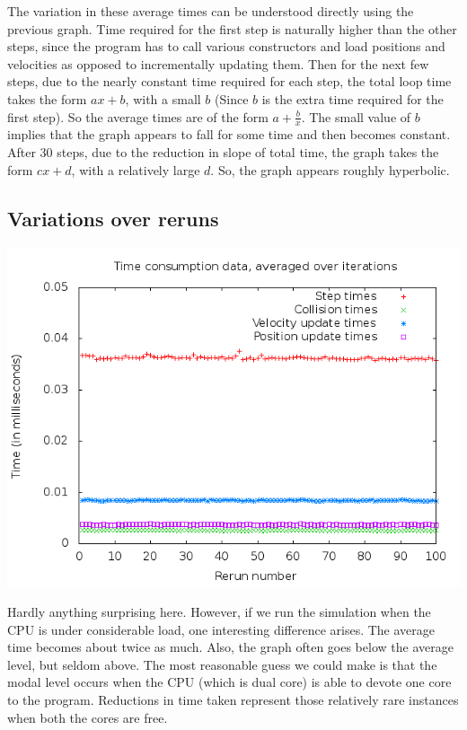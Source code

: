 \documentclass[a4paper,11pt]{article}
\begin{document}
			The variation in these average times can be understood directly using
			the previous graph. Time required for the first step is naturally
			higher than the other steps, since the program has to call various
			constructors and load positions and velocities as opposed to
			incrementally updating them. Then for the next few steps, due to the
			nearly constant time required for each step, the total loop time takes
			the form $ax+b$, with a small $b$ (Since $b$ is the extra time
			required for the first step). So the average times are of the form
			$a+\frac{b}{x}$. The small value of $b$ implies that the graph appears
			to fall for some time and then becomes constant. After 30 steps, due
			to the reduction in slope of total time, the graph takes the form
			$cx+d$, with a relatively large $d$. So, the graph appears roughly
			hyperbolic.
		
		\subsection{Variations over reruns}
			\begin{center}
				\includegraphics[scale=0.5]{./doc/images/g16_plot03.png}
			\end{center}
			
			Hardly anything surprising here. However, if we run the simulation
			when the CPU is under considerable load, one interesting difference
			arises. The average time becomes about twice as much. Also, the graph
			often goes below the average level, but seldom above.
			The most reasonable  guess we could make is that the modal level
			occurs when the CPU (which is dual core) is able to devote one core to
			the program. Reductions in time taken represent those relatively rare
			instances when both the cores are free.
		
\end{document}
